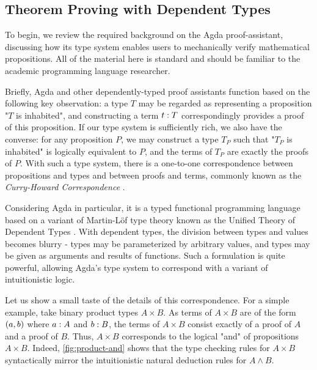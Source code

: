 \subsection{Theorem Proving with Dependent Types}\label{sec:dependent-types}
To begin, we review the required background on the Agda proof-assistant, discussing how its type system enables users to mechanically verify mathematical propositions. All of the material here is standard and should be familiar to the academic programming language researcher.

Briefly, Agda and other dependently-typed proof assistants function based on the following key observation: a type $T$ may be regarded as representing a proposition "$T$ is inhabited", and constructing a term $t : T$ correspondingly provides a proof of this proposition. If  our type system is sufficiently rich, we also have the converse: for any proposition $P$, we may construct a type $T_P$ such that "$T_P$ is inhabited" is logically equivalent to $P$, and the terms of $T_P$ are exactly the proofs of $P$. With such a type system, there is a one-to-one correspondence between propositions and types and between proofs and terms, commonly known as the \emph{Curry-Howard Correspondence} \cite{howard1980formulae}. 

Considering Agda in particular, it is a typed functional programming language based on a variant of Martin-L\"of type theory \cite{DBLP:books/daglib/0000395} known as the Unified Theory of Dependent Types \cite{DBLP:books/daglib/0078470, norell:thesis}. With dependent types, the division between types and values becomes blurry - types may be parameterized by arbitrary values, and types may be given as arguments and results of functions. Such a formulation is quite powerful, allowing Agda's type system to correspond with a variant of intuitionistic logic. 

Let us show a small taste of the details of this correspondence. For a simple example, take binary product types $A \times B$. As terms of $A \times B$ are of the form $(a , b)$ where $a : A$ and $b : B$, the terms of $A \times B$ consist exactly of a proof of $A$ and a proof of $B$. Thus, $A \times B$ corresponds to the logical "and" of propositions $A \times B$. Indeed, \autoref{fig:product-and} shows that the type checking rules for $A \times B$ syntactically mirror the intuitionistic natural deduction rules for $A \land B$.



